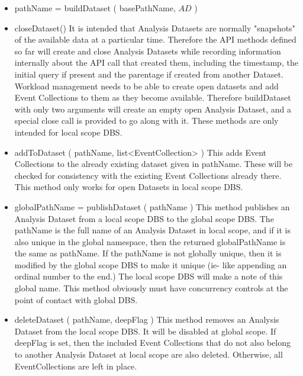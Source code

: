 \documentclass{cmspaper}
\begin{document}
\begin{itemize}
\item  pathName = buildDataset ( basePathName, $AD$ )
\item  closeDataset() 
       It is intended that Analysis Datasets are normally "snapshots" of the 
       available data at a particular time.  Therefore the API methods defined so 
       far will create and close Analysis Datasets while recording information 
       internally about the API call that created them, including the timestamp,
       the initial query if present and the parentage if created from another 
       Dataset.  Workload management needs to be able to create open datasets
       and add Event Collections to them as they become available.  Therefore  
       buildDataset with only two arguments will create an empty open Analysis 
       Dataset, and a special close call is provided to go along with it.
       These methods are only intended for local scope DBS. 

\item  addToDataset ( pathName, list<EventCollection> )
       This adds Event Collections to the already existing dataset given in 
       pathName.  These will be checked for consistency with the existing 
       Event Collections already there.  This method only works for 
       open Datasets in local scope DBS.
   
\item  globalPathName = publishDataset ( pathName )
      This method publishes an Analysis Dataset from a local scope DBS to the 
      global scope DBS.  The pathName is the full name of an Analysis Dataset in 
      local scope, and if it is also unique in the global namespace, then the 
      returned globalPathName is the same as pathName.  If the pathName is not 
      globally unique, then it is modified by the global scope DBS to make it 
      unique (ie- like appending an ordinal number to the end.) The local scope 
      DBS will make a note of this global name.  This method obviously must have
      concurrency controls at the point of contact with global DBS.

\item  deleteDataset ( pathName, deepFlag ) 
      This method removes an Analysis Dataset from the local scope DBS.  It will 
      be disabled at global scope.  If deepFlag is set, then the included Event 
      Collections that do not also belong to another Analysis Dataset at local 
      scope are also deleted.  Otherwise, all EventCollections are left in place.
\end{itemize}
\end{document}
